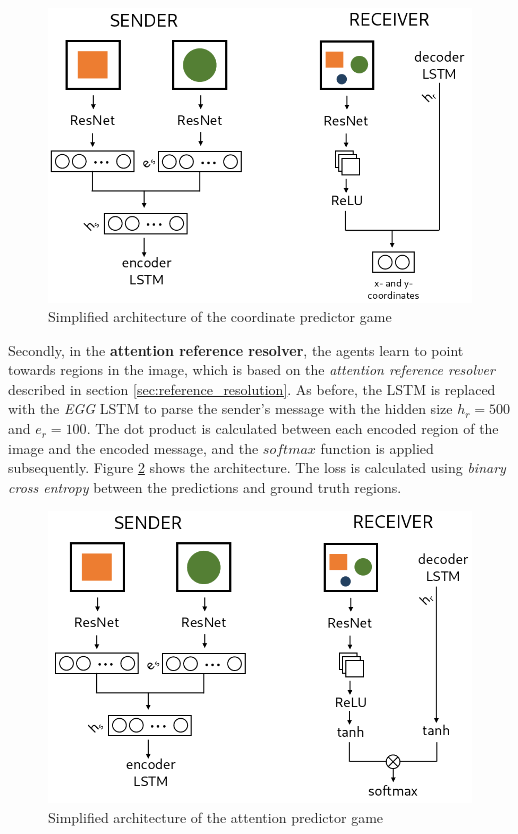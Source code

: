 \begin{figure}[ht]
    \centering
    \includegraphics[width=.7\linewidth]{figures/arch_coordinate_predictor_game.png}
    \caption{Simplified architecture of the coordinate predictor game}
    \label{fig:coordinate_predictor_game_architecture}
\end{figure}

Secondly, in the \textbf{attention reference resolver}, the agents learn to point towards regions in the image, which is based on the \emph{attention reference resolver} described in section \ref{sec:reference_resolution}.
As before, the LSTM is replaced with the \emph{EGG} LSTM to parse the sender's message with the hidden size $h_r=500$ and $e_r=100$.
The dot product is calculated between each encoded region of the image and the encoded message, and the $softmax$ function is applied subsequently.
Figure \ref{fig:attention_predictor_game_architecture} shows the architecture.
The loss is calculated using \emph{binary cross entropy} between the predictions and ground truth regions.

\begin{figure}[ht]
    \centering
    \includegraphics[width=.7\linewidth]{figures/arch_attention_predictor_game.png}
    \caption{Simplified architecture of the attention predictor game}
    \label{fig:attention_predictor_game_architecture}
\end{figure}

